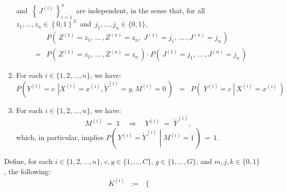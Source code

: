 \begin{theorem}
\begin{enumerate}
	and
	\,$\left\{\,J^{(i)}\,\right\}_{i=1}^{n}$\,
	are independent, in the sense that, for all
	\,$z_{1}, \ldots, z_{n} \in \left\{0,1\right\}^{3}$\, and \,$j_{1}, \ldots, j_{n} \in \{0,1\}$,\,
	\begin{eqnarray*}
	&&
		P\!\left(\,Z^{(1)}=z_{1},\,\ldots\,,Z^{(n)}=z_{n},\;J^{(1)}=j_{1},\,\ldots\,,J^{(n)}=j_{n}\,\right)
	\\
	& = &
		P\!\left(\,Z^{(1)}=z_{1},\,\ldots\,,Z^{(n)}=z_{n}\,\right)
		\cdot
		P\!\left(\,J^{(1)}=j_{1},\,\ldots\,,J^{(n)}=j_{n}\,\right)
	\end{eqnarray*}
\item\label{MzeroImplies}
	For each $i\in\{1,2,\ldots,n\}$, we have:
	\begin{equation*}
	P\!\left(\left.Y^{(i)} = c\,\;\right\vert X^{(i)}=x^{(i)},\widetilde{Y}^{(i)}=y,M^{(i)}=0\,\right)
	\;\; = \;\;
	P\!\left(\;Y^{(i)} = c\;\left\vert\,X^{(i)}=x^{(i)}\right.\,\right)
	\end{equation*}
\item\label{MoneImpliesCEqualsY}
	For each $i\in\{1,2,\ldots,n\}$, we have:
	\begin{equation*}
	M^{(i)} \; = \; 1
	\quad\Longrightarrow\quad
	Y^{(i)} \; = \; \widetilde{Y}^{(i)},
	\end{equation*}
	which, in particular, implies $P\!\left(\,\left.Y^{(i)} = \widetilde{Y}^{(i)}\;\right\vert\;M^{(i)}=1\,\right)\,=\,1$.
\end{enumerate}
\renewcommand{\theenumi}{\roman{enumi}}
\renewcommand{\labelenumi}{\textnormal{(\theenumi)}$\;\;$}
Define, for each
\;$i \in \{1,2,\ldots,n\}$,
\;$c,y \in \{1,\ldots,C\}$,
\;$g \in \{1,\ldots,G\}$,
\;and
\;$m,j,k \in \{0,1\}$,
\;the following:
\begin{equation*}
\begin{array}{ccll}
	K^{(i)}
		&:=&
		\left\{\begin{array}{cl}

\end{array}
\end{array}
\end{equation*}
\end{theorem}
